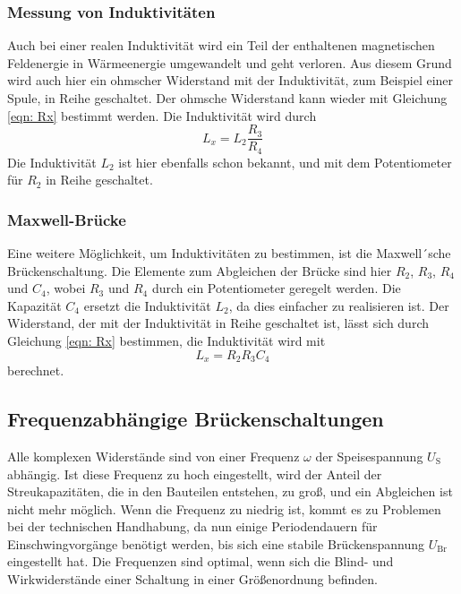     \subsubsection{Messung von Induktivitäten}

        Auch bei einer realen Induktivität wird ein Teil der enthaltenen magnetischen Feldenergie in Wärmeenergie umgewandelt
        und geht verloren. Aus diesem Grund wird auch hier ein ohmscher Widerstand mit der Induktivität, zum Beispiel einer Spule,
        in Reihe geschaltet.
        Der ohmsche Widerstand kann wieder mit Gleichung \eqref{eqn: Rx} bestimmt werden.
        Die Induktivität wird durch 
        \begin{equation}
            L_x = L_2 \frac{R_3}{R_4}
        \end{equation}
        Die Induktivität $L_2$ ist hier ebenfalls schon bekannt, und mit dem Potentiometer für $R_2$ in Reihe geschaltet.

    \subsubsection{Maxwell-Brücke}

        Eine weitere Möglichkeit, um Induktivitäten zu bestimmen, ist die Maxwell´sche Brückenschaltung.
        Die Elemente zum Abgleichen der Brücke sind hier $R_2$, $R_3$, $R_4$ und $C_4$, wobei $R_3$ und $R_4$ durch ein
        Potentiometer geregelt werden. Die Kapazität $C_4$ ersetzt die Induktivität $L_2$, da dies 
        einfacher zu realisieren ist.
        Der Widerstand, der mit der Induktivität in Reihe geschaltet ist, lässt sich durch Gleichung \eqref{eqn: Rx} bestimmen,
        die Induktivität wird mit 
        \begin{equation}
            L_x = R_2 R_3 C_4
        \end{equation}
        berechnet.
    
\subsection{Frequenzabhängige Brückenschaltungen}   

    Alle komplexen Widerstände sind von einer Frequenz $\omega$ der Speisespannung $U_\text{S}$ abhängig.
    Ist diese Frequenz zu hoch eingestellt, wird der Anteil der Streukapazitäten, die in den Bauteilen
    entstehen, zu groß, und ein Abgleichen ist nicht mehr möglich. 
    Wenn die Frequenz zu niedrig ist, kommt es zu Problemen bei der technischen Handhabung, 
    da nun einige Periodendauern für Einschwingvorgänge benötigt werden, bis sich eine stabile Brückenspannung $U_\text{Br}$
    eingestellt hat.
    Die Frequenzen sind optimal, wenn sich die Blind- und Wirkwiderstände einer Schaltung
    in einer Größenordnung befinden.

